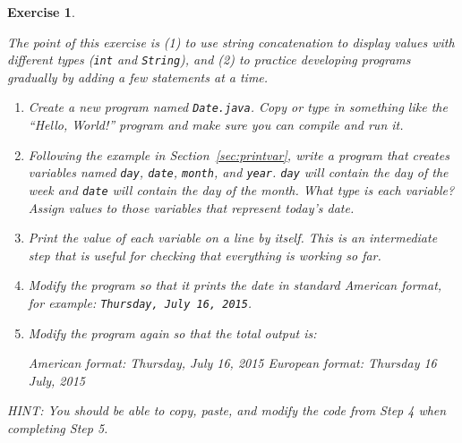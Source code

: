 \documentclass[12pt]{book}
\theoremstyle{exercise}
\newtheorem{exercise}{Exercise}[chapter]
\newcommand{\java}[1]{\verb"#1"}
\newcommand{\java}[1]{\lstinline{#1}} %
\begin{document}
\begin{exercise}
\label{ex:date}

The point of this exercise is (1) to use string concatenation to display values with different types (\java{int} and \java{String}), and (2) to practice developing programs gradually by adding a few statements at a time.

\begin{enumerate}

\item Create a new program named {\tt Date.java}.
Copy or type in something like the ``Hello, World!'' program and make sure you can compile and run it.

\item Following the example in Section~\ref{sec:printvar}, write a program that creates variables named \java{day}, \java{date}, \java{month}, and \java{year}.
\java{day} will contain the day of the week and \java{date} will contain the day of the month.
What type is each variable?
Assign values to those variables that represent today's date.

\item Print the value of each variable on a line by itself.
This is an intermediate step that is useful for checking that everything is working so far.

\item Modify the program so that it prints the date in standard American format, for example: {\tt Thursday, July 16, 2015}.

\item Modify the program again so that the total output is:

\begin{stdout}
American format:
Thursday, July 16, 2015
European format:
Thursday 16 July, 2015
\end{stdout}

\end{enumerate}

HINT: You should be able to copy, paste, and modify the code from Step 4 when completing Step 5.

\end{exercise}
\end{document}
